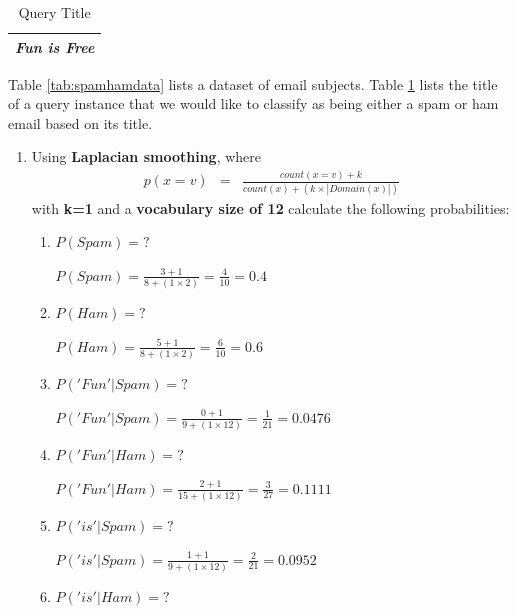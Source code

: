 \documentclass[solution]{ditpaper}
\begin{document}
\begin{table}[h]
\caption{Query Title}
\centering
\begin{tabular}{l}
\hline
\textit{Fun is Free}\\
\hline
\end{tabular}
\label{tab:spamhamquery}
\end{table}


\question Table \ref{tab:spamhamdata} lists a dataset of email subjects. Table \ref{tab:spamhamquery} lists the title of a query instance that we would like to classify as being either a spam or ham email based on its title. 
	\begin{enumerate}
		\item Using \textbf{Laplacian smoothing}, where 
		\begin{eqnarray*}
		p(x=v) &=& \frac{count(x=v)+k}{count(x) +( k \times |Domain(x)|)}
		\end{eqnarray*}
		with \textbf{k=1} and a \textbf{vocabulary size of 12} calculate the following probabilities:
			\begin{enumerate}
				\item $P(Spam)=?$
					\begin{answer}
						$P(Spam) = \frac{3+1}{8 + (1 \times 2)} = \frac{4}{10} = 0.4$
					\end{answer}
				\item $P(Ham)=?$
					\begin{answer}
						$P(Ham) = \frac{5+1}{8 + (1 \times 2)} = \frac{6}{10} = 0.6$
					\end{answer}
				\item $P('Fun'|Spam)=?$
					\begin{answer}
						$P('Fun'|Spam) = \frac{0+1}{9 + (1 \times 12)} = \frac{1}{21} = 0.0476$
					\end{answer}
				\item $P('Fun'|Ham)=?$
					\begin{answer}
						$P('Fun'|Ham) = \frac{2+1}{15 + (1 \times 12)} = \frac{3}{27} = 0.1111$
					\end{answer}
				\item $P('is'|Spam)=?$
					\begin{answer}
						$P('is'|Spam) = \frac{1+1}{9 + (1 \times 12)} = \frac{2}{21} = 0.0952$
					\end{answer}
				\item $P('is'|Ham)=?$
					\begin{answer}

\end{answer}
\end{enumerate}
\end{enumerate}
\end{document}
